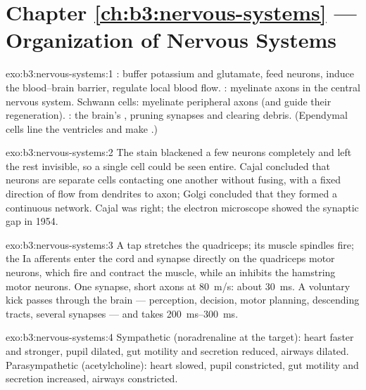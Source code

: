 \section*{Chapter \ref{ch:b3:nervous-systems} --- Organization of Nervous Systems}

\begin{solution}{exo:b3:nervous-systems:1}
: buffer potassium and glutamate, feed neurons, induce the
blood--brain barrier, regulate local blood flow. :
myelinate axons in the central nervous system. Schwann cells:
myelinate peripheral axons (and guide their regeneration). :
the brain's , pruning synapses and clearing debris.
(Ependymal cells line the ventricles and make .)
\end{solution}

\begin{solution}{exo:b3:nervous-systems:2}
The stain blackened a few neurons completely and left the rest
invisible, so a single cell could be seen entire. Cajal concluded that
neurons are separate cells contacting one another without fusing, with
a fixed direction of flow from dendrites to axon; Golgi concluded that
they formed a continuous network. Cajal was right; the electron
microscope showed the synaptic gap in 1954.
\end{solution}

\begin{solution}{exo:b3:nervous-systems:3}
A tap stretches the quadriceps; its muscle spindles fire; the Ia
afferents enter the cord and synapse directly on the quadriceps motor
neurons, which fire and contract the muscle, while an 
inhibits the hamstring motor neurons. One synapse, short axons at
\qty{80}{m/s}: about \qty{30}{ms}. A voluntary kick passes through the
brain --- perception, decision, motor planning, descending tracts,
several synapses --- and takes \qtyrange{200}{300}{ms}.
\end{solution}

\begin{solution}{exo:b3:nervous-systems:4}
Sympathetic (noradrenaline at the target): heart faster and stronger,
pupil dilated, gut motility and secretion reduced, airways dilated.
Parasympathetic (acetylcholine): heart slowed, pupil constricted, gut
motility and secretion increased, airways constricted.
\end{solution}

